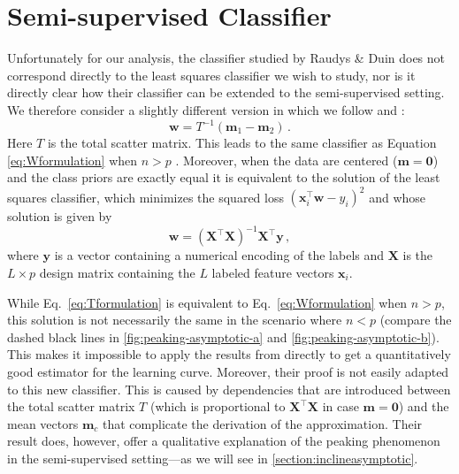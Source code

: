 \documentclass[twoside]{memoir}\usepackage[]{graphicx}\usepackage{xcolor}
\renewcommand{\cite}{\citep}
\renewcommand{\vec}{\mathbf}
\begin{document}
\section{Semi-supervised Classifier} \label{section:semi-supervised}
Unfortunately for our analysis, the classifier studied by Raudys \& Duin does not correspond directly to the least squares classifier we wish to study, nor is it directly clear how their classifier can be extended to the semi-supervised setting.
We therefore consider a slightly different version in which we follow \citet{Duin1995} and \citet{Fan2008}:
\begin{equation}
\vec{w} = T^{-1} (\vec{m}_1-\vec{m}_2) \label{eq:Tformulation} \, .
\end{equation}
Here $T$ is the total scatter matrix. This leads to the same classifier as Equation \eqref{eq:Wformulation} when $n>p$ \cite{Duin1995}. Moreover, when the data are centered ($\vec{m}=\vec{0}$) and the class priors are exactly equal it is equivalent to the solution of the least squares classifier, which minimizes the squared loss $(\vec{x}_i^\top \vec{w} - y_i)^2$ and whose solution is given by
\begin{equation}
\vec{w} = (\mathbf{X}^\top \mathbf{X})^{-1} \mathbf{X}^\top \vec{y} \, , \label{eq:solutionsupervised}
\end{equation}
where $\vec{y}$ is a vector containing a numerical encoding of the labels and $\mathbf{X}$ is the $L \times p$ design matrix containing the $L$ labeled feature vectors $\vec{x}_i$.

While Eq.~\eqref{eq:Tformulation} is equivalent to Eq.~\eqref{eq:Wformulation} when $n>p$, this solution is not necessarily the same in the scenario where $n<p$ (compare the dashed black lines in \cref{fig:peaking-asymptotic-a} and \cref{fig:peaking-asymptotic-b}). This makes it impossible to apply the results from \cite{Raudys1998} directly to get a quantitatively good estimator for the learning curve. Moreover, their proof is not easily adapted to this new classifier. This is caused by dependencies that are introduced between the total scatter matrix $T$ (which is proportional to $\mathbf{X}^\top \mathbf{X}$ in case $\vec{m}=\vec{0}$) and the mean vectors $\vec{m}_c$ that complicate the derivation of the approximation. Their result does, however, offer a qualitative explanation of the peaking phenomenon in the semi-supervised setting---as we will see in \cref{section:inclineasymptotic}.
\end{document}
